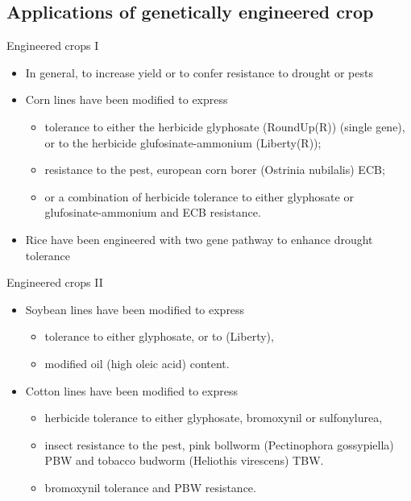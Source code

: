 \documentclass[11pt,dvipsnames,ignorenonframetext,aspectratio=169]{beamer}
\providecommand{\tightlist}{%
  \setlength{\itemsep}{0pt}\setlength{\parskip}{0pt}}
\begin{document}
\hypertarget{applications-of-genetically-engineered-crop}{%
\subsection{Applications of genetically engineered
crop}\label{applications-of-genetically-engineered-crop}}

\begin{frame}{Engineered crops I}
\protect\hypertarget{engineered-crops-i}{}
\begin{itemize}
\tightlist
\item
  In general, to increase yield or to confer resistance to drought or
  pests
\item
  Corn lines have been modified to express

  \begin{itemize}
  \tightlist
  \item
    tolerance to either the herbicide glyphosate (RoundUp(R)) (single
    gene), or to the herbicide glufosinate-ammonium (Liberty(R));
  \item
    resistance to the pest, european corn borer (Ostrinia nubilalis)
    ECB;
  \item
    or a combination of herbicide tolerance to either glyphosate or
    glufosinate-ammonium and ECB resistance.
  \end{itemize}
\item
  Rice have been engineered with two gene pathway to enhance drought
  tolerance
\end{itemize}
\end{frame}

\begin{frame}{Engineered crops II}
\protect\hypertarget{engineered-crops-ii}{}
\begin{itemize}
\tightlist
\item
  Soybean lines have been modified to express

  \begin{itemize}
  \tightlist
  \item
    tolerance to either glyphosate, or to (Liberty),
  \item
    modified oil (high oleic acid) content.
  \end{itemize}
\item
  Cotton lines have been modified to express

  \begin{itemize}
  \tightlist
  \item
    herbicide tolerance to either glyphosate, bromoxynil or
    sulfonylurea,
  \item
    insect resistance to the pest, pink bollworm (Pectinophora
    gossypiella) PBW and tobacco budworm (Heliothis virescens) TBW.
  \item
    bromoxynil tolerance and PBW resistance.
  \end{itemize}
\end{itemize}
\end{frame}
\end{document}
